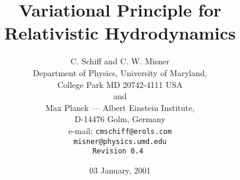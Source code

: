 %
%
%
%
%
%

\def\half{\mbox{$\frac{1}{2}$}}
\def\.{{\quad .}}
\def\_.{{\quad .}}
\def\_,{{\quad ,}}
\def\be{\begin{equation}}
\def\ee{\end{equation}}
\def\bea{\begin{eqnarray}}
\def\eea{\end{eqnarray}}
\def\po{{\hat \rho}_{0}}


%
%



%
%
\title{Variational Principle for Relativistic Hydrodynamics}
%
\author{C. Schiff and C. W. Misner\\
        Department of Physics, University of Maryland,\\
         College Park MD 20742-4111 USA\\
         and\\
         Max Planck --- Albert Einstein Institute,\\
         D-14476 Golm, Germany\\
           \rm
         e-mail: \tt  cmschiff@erols.com\\
                 \tt  misner@physics.umd.edu\\
                      Revision 0.4
}
\date{03 January, 2001}
\maketitle


